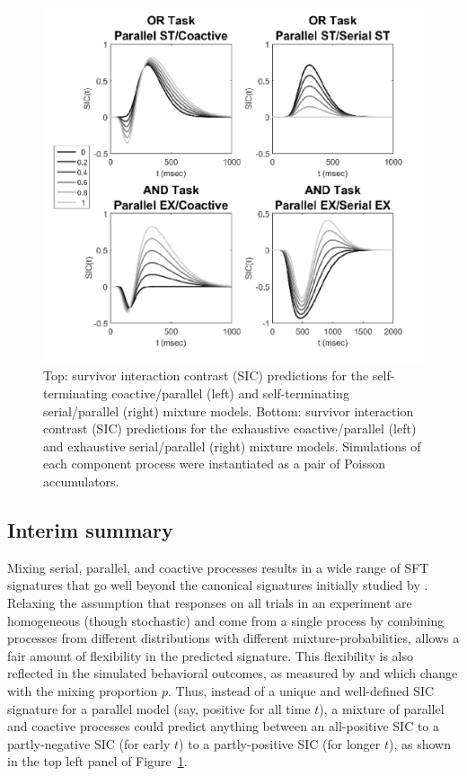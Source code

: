 \begin{figure}[htb]
\centering
\includegraphics[scale=1]{Figures/Mix/SICpoisson.jpg}
\caption{Top: survivor interaction contrast (SIC) predictions for the self-terminating coactive/parallel (left) and self-terminating serial/parallel (right) mixture models. Bottom: survivor interaction contrast (SIC) predictions for the exhaustive coactive/parallel (left) and exhaustive serial/parallel (right) mixture models. Simulations of each component process were instantiated as a pair of Poisson accumulators.}
\label{fig:Ch5_SICpoisson}
\end{figure}


\subsection{Interim summary}
Mixing serial, parallel, and coactive processes results in a wide range of SFT signatures that go well beyond the canonical signatures initially studied by . Relaxing the assumption that responses on all trials in an experiment are homogeneous (though stochastic) and come from a single process by combining processes from different distributions with different mixture-probabilities, allows a fair amount of flexibility in the predicted signature. This flexibility is also reflected in the simulated behavioral outcomes, as measured by \SIC and \Ct which change with the mixing proportion $p$. Thus, instead of a unique and well-defined SIC signature for a parallel model (say, positive for all time $t$), a mixture of parallel and coactive processes could predict anything between an all-positive SIC to a partly-negative SIC (for early $t$) to a partly-positive SIC (for longer $t$), as shown in the top left panel of Figure~\ref{fig:Ch5_SICpoisson}. 


